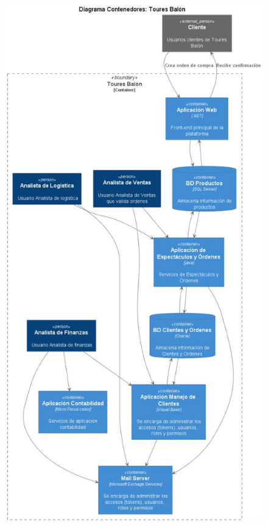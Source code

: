 \documentclass[12pt]{article}
\begin{document}
\begin{figure}[ht]
\centering
\centering
\includegraphics[scale=0.4]{Diagrama de contenedores.jpeg}
\label{2}
\end{figure}
\FloatBarrier
\end{document}
